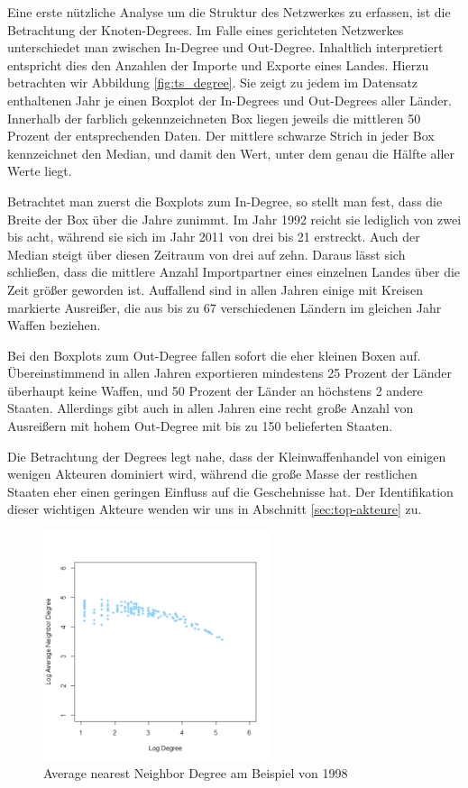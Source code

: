 \documentclass[a4paper,ngerman,oneside,titlepage,bibliography=totoc,11pt]{scrreprt}
\begin{document}
Eine erste nützliche Analyse um die Struktur des Netzwerkes zu erfassen, ist die Betrachtung der Knoten-Degrees. Im Falle eines gerichteten Netzwerkes unterschiedet man zwischen In-Degree und Out-Degree. Inhaltlich interpretiert entspricht dies den Anzahlen der Importe und Exporte eines Landes. Hierzu betrachten wir Abbildung \ref{fig:ts_degree}. Sie zeigt zu jedem im Datensatz enthaltenen Jahr je einen Boxplot der In-Degrees und Out-Degrees aller Länder. Innerhalb der farblich gekennzeichneten Box liegen jeweils die mittleren 50 Prozent der entsprechenden Daten. Der mittlere schwarze Strich in jeder Box kennzeichnet den Median, und damit den Wert, unter dem genau die Hälfte aller Werte liegt.

Betrachtet man zuerst die Boxplots zum In-Degree, so stellt man fest, dass die Breite der Box über die Jahre zunimmt. Im Jahr 1992 reicht sie lediglich von zwei bis acht, während sie sich im Jahr 2011 von drei bis 21 erstreckt. Auch der Median steigt über diesen Zeitraum von drei auf zehn. Daraus lässt sich schließen, dass die mittlere Anzahl Importpartner eines einzelnen Landes über die Zeit größer geworden ist. Auffallend sind in allen Jahren einige mit Kreisen markierte Ausreißer,
die aus bis zu 67 verschiedenen Ländern im gleichen Jahr Waffen beziehen.

Bei den Boxplots zum Out-Degree fallen sofort die eher kleinen Boxen auf. Übereinstimmend in allen Jahren exportieren mindestens 25 Prozent der Länder überhaupt keine Waffen, und 50 Prozent der Länder an höchstens 2 andere Staaten. Allerdings gibt auch in allen Jahren eine recht große Anzahl von Ausreißern mit hohem Out-Degree mit bis zu 150 belieferten Staaten. 

Die Betrachtung der Degrees legt nahe, dass der Kleinwaffenhandel von einigen wenigen Akteuren dominiert wird, während die große Masse der restlichen Staaten eher einen geringen Einfluss auf die Geschehnisse hat. Der Identifikation dieser wichtigen Akteure wenden wir uns in Abschnitt \ref{sec:top-akteure} zu.


\begin{figure}[htbp]
	\centering
		\includegraphics[width=0.60\textwidth]{Grafiken/and.png}
	\caption{Average nearest Neighbor Degree am Beispiel von 1998}
	\label{fig:and}
\end{figure}
\end{document}
